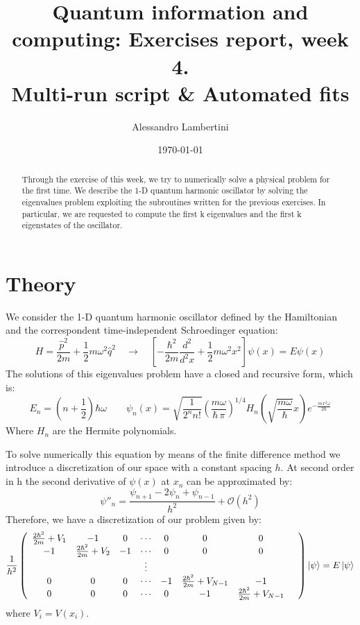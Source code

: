 \documentclass[prb,9pt,notitlepage]{revtex4-1}
\begin{document}
\title{Quantum information and computing: Exercises report, week 4. \\ Multi-run script \& Automated fits }

\author{Alessandro Lambertini}


\date{\today}

\begin{abstract}
Through the exercise of this week, we try to numerically solve a physical problem for the first time. We describe the 1-D quantum harmonic oscillator by solving the eigenvalues problem exploiting the subroutines written for the previous exercises. In particular, we are requested to compute the first k eigenvalues and the first k eigenstates of the oscillator.
\end{abstract}

\maketitle

\section{Theory}
We consider the 1-D quantum harmonic oscillator defined by the Hamiltonian and the correspondent time-independent Schroedinger equation:
\begin{equation}
  H = \frac{\hat{p}^2}{2m} + \frac{1}{2} m\omega^2\hat{q}^2 \quad \longrightarrow \quad \left[-\frac{\hbar^2}{2m}\frac{d^2}{d^2x} + \frac{1}{2}m \omega^2x^2\right]\psi(x) = E \psi(x)
\end{equation}
The solutions of this eigenvalues problem have a closed and recursive form, which is:
\begin{equation}
  E_n = (n+\frac{1}{2} )\hbar\omega \qquad   \psi_{n}(x)={\sqrt {\frac {1}{2^{n}n!}}}\left({\frac {m\omega }{\hbar \,\pi }}\right)^{1/4}H_{n}\left({\sqrt {\frac {m\omega }{\hbar }}}x\right)e^{-{\frac {mx^{2}\omega }{2\hbar }}}
\end{equation}
Where $H_n$ are the Hermite polynomials.

To solve numerically this equation by means of the finite difference method we introduce a discretization of our space with a constant spacing $h$.
At second order in h the second derivative of $\psi(x)$ at $x_n$ can be approximated by:
\begin{equation}
  \psi''_n = \frac{\psi_{n+1}-2\psi_n+\psi_{n-1}}{h^2} + \mathcal{O}(h^2)
\end{equation}
Therefore, we have a discretization of our problem given by:
\begin{equation}
\frac{1}{h^2}\left( \begin{array}{cccccccc} \frac{2\hbar^2}{2m} + V_1 & -1 & 0 & \cdots & 0 & 0 & 0  \\ -1 & \frac{2\hbar^2}{2m}+ V_2 & -1 & \cdots & 0 & 0 & 0  \\ & & &\vdots  \\ 0 & 0 & 0 & \cdots&-1 & \frac{2\hbar^2}{2m}+ V_{N-1} &-1& \\ 0 & 0 & 0 & \cdots&0 &-1& \frac{2\hbar^2}{2m}+ V_{N-1} \\ \end{array}
\right)\ket{\psi} = E\ket{\psi}
\end{equation}
where $V_i=V(x_i)$.
\end{document}
